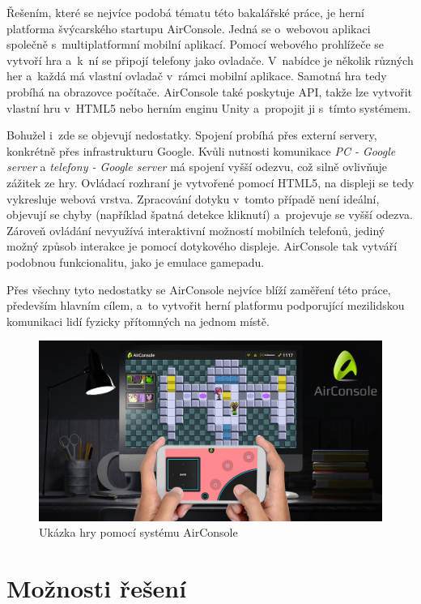 \documentclass[thesis=B,czech,hidelinks]{FITthesis}[2012/06/26] %
\begin{document}
Řešením, které se nejvíce podobá tématu této bakalářské práce, je herní platforma švýcarského startupu AirConsole\cite{airconsole}. Jedná se o~webovou aplikaci společně s~multiplatformní mobilní aplikací. Pomocí webového prohlížeče se vytvoří hra a~k~ní se připojí telefony jako ovladače. V~nabídce je několik různých her a~každá má vlastní ovladač v~rámci mobilní aplikace. Samotná hra tedy probíhá na obrazovce počítače. AirConsole také poskytuje API, takže lze vytvořit vlastní hru v~HTML5 nebo herním enginu Unity a~propojit ji s~tímto systémem.

Bohužel i~zde se objevují nedostatky. Spojení probíhá přes externí servery, konkrétně přes infrastrukturu Google\cite{airconsole}. Kvůli nutnosti komunikace \textit{PC - Google server} a \textit{telefony - Google server} má spojení vyšší odezvu, což silně ovlivňuje zážitek ze hry. Ovládací rozhraní je vytvořené pomocí HTML5, na displeji se tedy vykresluje webová vrstva. Zpracování dotyku v~tomto případě není ideální, objevují se chyby (například špatná detekce kliknutí) a~projevuje se vyšší odezva. Zároveň ovládání nevyužívá interaktivní možností mobilních telefonů, jediný možný způsob interakce je pomocí dotykového displeje. AirConsole tak vytváří podobnou funkcionalitu, jako je emulace gamepadu.

Přes všechny tyto nedostatky se AirConsole nejvíce blíží zaměření této práce, především hlavním cílem, a~to vytvořit herní platformu podporující mezilidskou komunikaci lidí fyzicky přítomných na jednom místě.

\begin{figure}[h]
\includegraphics[width=\textwidth]{airconsole}
\caption{Ukázka hry pomocí systému AirConsole\cite{airconsole}}
\end{figure}

\section{Možnosti řešení}
\end{document}
